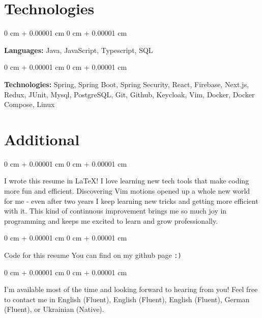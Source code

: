 \documentclass[10pt, letterpaper]{article}
\newenvironment{onecolentry}{
    \begin{adjustwidth}{
        0 cm + 0.00001 cm
    }{
        0 cm + 0.00001 cm
    }
}{
    \end{adjustwidth}
} %
\begin{document}
    \section{Technologies}
        \begin{onecolentry}
            \textbf{Languages:} Java, JavaScript, Typescript, SQL
        \end{onecolentry}

        \vspace{0.2 cm}

        \begin{onecolentry}
            \textbf{Technologies:} Spring, Spring Boot, Spring Security, React, Firebase, Next.js, Redux, JUnit, Mysql, PostgreSQL, Git, Github, Keycloak, Vim, Docker, Docker Compose, Linux
        \end{onecolentry}


    \section{Additional}

    \begin{onecolentry}
        I wrote this resume in \LaTeX{}! I love learning new tech tools that make coding more fun and efficient. Discovering Vim motions opened up a whole new world for me - even after two years I keep learning new tricks and getting more efficient with it. This kind of continuous improvement brings me so much joy in programming and keeps me excited to learn and grow professionally.
    \end{onecolentry}

    \vspace{0.1 cm}
    \begin{onecolentry}
        Code for this resume You can find on my github page \texttt{:)}
    \end{onecolentry}

    \vspace{0.1 cm}
    \begin{onecolentry}
    I'm available most of the time and looking forward to hearing from you! Feel free to contact me in English (Fluent), English (Fluent), English (Fluent), German (Fluent), or Ukrainian (Native).
    \end{onecolentry}
\end{document}
